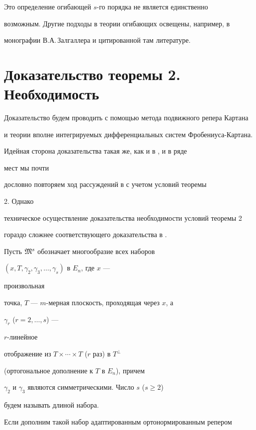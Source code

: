  


Это определение огибающей $s$-го порядка не является единственно 


возможным. Другие подходы в теории огибающих освещены, например, в 


монографии В.А.\,Залгаллера \cite{Zal} и цитированной там литературе. 


 


\section{Доказательство теоремы 2. Необходимость} 


 


Доказательство будем проводить с помощью метода подвижного репера Картана 


и теории вполне интегрируемых дифференциальных систем Фробениуса-Картана. 


Идейная сторона доказательства такая же, как и в \cite{Lum1}, и в ряде 


мест мы почти 


дословно повторяем ход рассуждений в \cite{Lum1} с учетом условий теоремы 


2. Однако 


техническое осуществление доказательства необходимости условий теоремы 2 


гораздо сложнее соответствующего доказательства в \cite{Lum1}. 


 


Пусть $\frak M^s$ обозначает многообразие всех наборов 


$(x,T,\gamma_2,\gamma_3,\dotsc,\gamma_s)$ в $E_n$, где $x$ --- 


произвольная 


точка, $T$ --- $m$-мерная плоскость, проходящая через $x$, а 


$\gamma_r$ ($r=2,\dotsc,s$) --- 


$r$-линейное 


отображение из $T\times\dotsb\times T$ ($r$ раз) в $T^\bot$ 


(ортогональное дополнение к $T$ в $E_n$), причем 


$\gamma_2$ и $\gamma_3$ являются симметрическими. Число $s$ ($s\ge 2$) 


будем называть длиной набора. 


Если дополним такой набор адаптированным ортонормированным репером 


